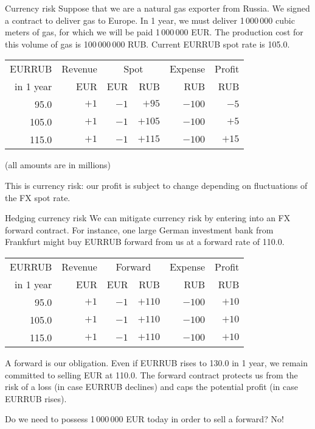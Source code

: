 \documentclass{beamer}
\begin{document}
\begin{frame}{Currency risk}
\justify
Suppose that we are a natural gas exporter from Russia. We signed a contract to deliver gas to Europe. In 1 year, we must deliver 1\,000\,000 cubic meters of gas, for which we will be paid 1\,000\,000 EUR. The production cost for this volume of gas is 100\,000\,000 RUB. Current EURRUB spot rate is 105.0.

\justify
\centering
\begin{tabular}{r|r|r|r|r|r}
EURRUB      & Revenue & \multicolumn{2}{c|}{Spot} & Expense & Profit \\
\cline{3-4}
in 1 year   & EUR   & EUR   & RUB & RUB & RUB \\ \hline
95.0        & $+1$  & $-1$ & $+95$         & $-100$  & $-5$ \\
105.0        & $+1$ & $-1$ & $+105$         & $-100$  & $+5$ \\
115.0        & $+1$ & $-1$ & $+115$          & $-100$ & $+15$ 
\end{tabular}

(all amounts are in millions)

\justify
This is \alert{currency risk}: our profit is subject to change depending on fluctuations of the FX spot rate.
\end{frame}



\begin{frame}{Hedging currency risk}
\justify
We can mitigate currency risk by entering into an FX forward contract. For instance, one large German investment bank from Frankfurt might buy EURRUB forward from us at a forward rate of 110.0.

\justify
\centering
\begin{tabular}{r|r|r|r|r|r}
EURRUB      & Revenue & \multicolumn{2}{c|}{Forward} & Expense & Profit \\
\cline{3-4}
in 1 year   & EUR     & EUR    & RUB              & RUB     & RUB   \\ \hline
95.0        & $+1$  & $-1$ & $+110$  & $-100$ & $+10$  \\
105.0        & $+1$  & $-1$ & $+110$  & $-100$ & $+10$  \\
115.0        & $+1$  & $-1$ & $+110$  & $-100$ & $+10$ 
\end{tabular}

\justify
A forward is our obligation. Even if EURRUB rises to 130.0 in 1 year, we remain committed to selling EUR at 110.0. The forward contract protects us from the risk of a loss (in case EURRUB declines) and caps the potential profit (in case EURRUB rises).

\justify
Do we need to possess 1\,000\,000 EUR today in order to sell a forward? No!
\end{frame}
\end{document}
